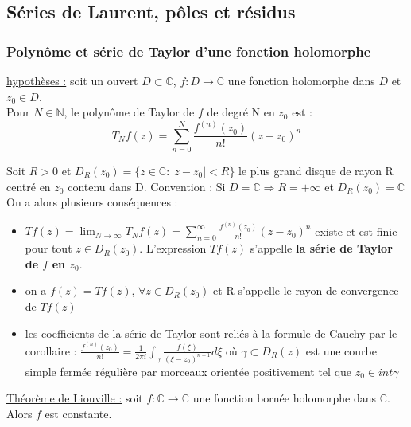 \documentclass[../main.tex]{subfiles}
\begin{document}
\subsection{Séries de Laurent, pôles et résidus}
\subsubsection{Polynôme et série de Taylor d'une fonction holomorphe}
\quad \underline{hypothèses :} soit un ouvert $D\subset \mathbb{C}$, $f:D\rightarrow \mathbb{C}$ une fonction holomorphe dans $D$ et $z_0 \in D$.\\

Pour $N \in \mathbb{N}$, le polynôme de Taylor de $f$ de degré N en $z_0$ est : \\
\begin{equation}
    T_N f(z) = \sum_{n=0}^N \frac{f^{(n)}(z_0)}{n!} (z-z_0)^n
\end{equation}

Soit $R>0$ et $D_R(z_0) = \{z\in \mathbb{C} : \lvert z-z_0\rvert <R \}$ le plus grand disque de rayon R centré en $z_0$ contenu dans D. \color{gray} Convention : Si $D=\mathbb{C} \Rightarrow R=+\infty$ et $D_R(z_0)=\mathbb{C}$\color{black}\\

On a alors plusieurs conséquences :\\
\begin{itemize}
    \item $Tf(z) = \lim_{N\rightarrow \infty} T_N f(z) = \sum_{n=0}^{\infty} \frac{f^{(n)}(z_0)}{n!}(z-z_0)^n$ existe et est finie pour tout $z\in D_R(z_0)$. L'expression $Tf(z)$ s'appelle \textbf{la série de Taylor de $f$ en $z_0$}.\\
    \item on a $f(z) = Tf(z)$, $\forall z\in D_R(z_0)$ et R s'appelle le rayon de convergence de $Tf(z)$\\
    \item les coefficients de la série de Taylor sont reliés à la formule de Cauchy par le corollaire :  $\frac{f^{(n)}(z_0)}{n!} = \frac{1}{2\pi i} \int_\gamma \frac{f(\xi)}{(\xi-z_0)^{n+1}}d\xi$ où $\gamma \subset D_R(z)$ est une courbe simple fermée régulière par morceaux orientée positivement tel que $z_0 \in int \gamma$\\
\end{itemize}

\quad \underline{Théorème de Liouville :} soit $f:\mathbb{C} \rightarrow \mathbb{C}$ une fonction bornée holomorphe dans $\mathbb{C}$. Alors $f$ est constante.\\
\end{document}
